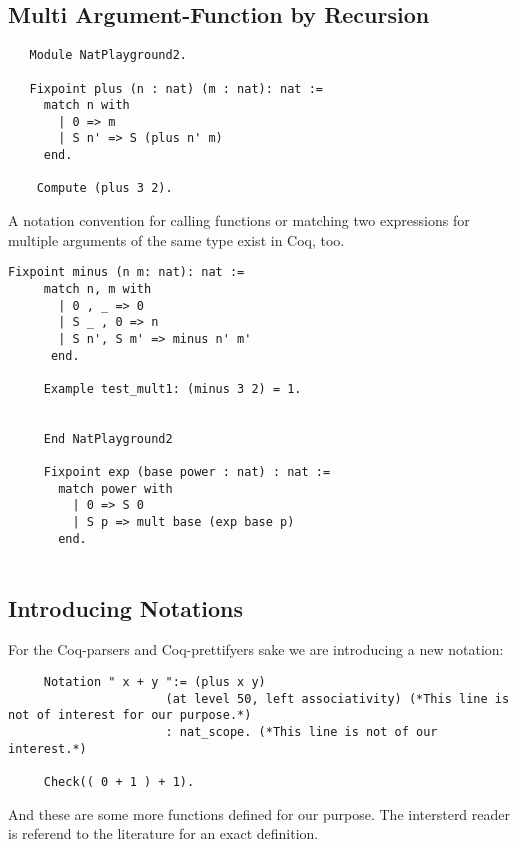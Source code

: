    \subsection{Multi Argument-Function by Recursion}
   
   \begin{lstlisting}
   Module NatPlayground2.
   
   Fixpoint plus (n : nat) (m : nat): nat :=
     match n with
       | 0 => m
       | S n' => S (plus n' m)
     end.
     
    Compute (plus 3 2). 
   \end{lstlisting}
   
    A notation convention for calling functions or matching two expressions for multiple arguments of the same type exist in Coq, too.
   
   \begin{lstlisting}[label = lst:minus_nat, caption={ \lstinline!minus! and \lstinline!exp!}]
    Fixpoint minus (n m: nat): nat :=
     match n, m with
       | 0 , _ => 0
       | S _ , 0 => n
       | S n', S m' => minus n' m'
      end.
      
     Example test_mult1: (minus 3 2) = 1.
     
      
     End NatPlayground2
     
     Fixpoint exp (base power : nat) : nat :=
       match power with
         | 0 => S 0
         | S p => mult base (exp base p)
       end.
         
   \end{lstlisting}
        
   \subsection{Introducing Notations}


    For the Coq-parsers and Coq-prettifyers sake we are introducing a new notation:
    
    \begin{lstlisting}
     Notation " x + y ":= (plus x y)
                      (at level 50, left associativity) (*This line is not of interest for our purpose.*)
                      : nat_scope. (*This line is not of our interest.*)
                      
     Check(( 0 + 1 ) + 1).
    \end{lstlisting} 
   
   And these are some more functions defined for our purpose. 
   The intersterd reader is referend to the literature for an exact definition.  
   
